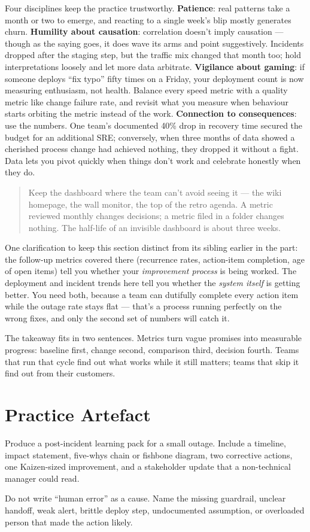 Four disciplines keep the practice trustworthy. \textbf{Patience}: real patterns take a month or two to emerge, and reacting to a single week's blip mostly generates churn. \textbf{Humility about causation}: correlation doesn't imply causation — though as the saying goes, it does wave its arms and point suggestively. Incidents dropped after the staging step, but the traffic mix changed that month too; hold interpretations loosely and let more data arbitrate. \textbf{Vigilance about gaming}: if someone deploys ``fix typo'' fifty times on a Friday, your deployment count is now measuring enthusiasm, not health. Balance every speed metric with a quality metric like change failure rate, and revisit what you measure when behaviour starts orbiting the metric instead of the work. \textbf{Connection to consequences}: use the numbers. One team's documented 40\% drop in recovery time secured the budget for an additional SRE; conversely, when three months of data showed a cherished process change had achieved nothing, they dropped it without a fight. Data lets you pivot quickly when things don't work and celebrate honestly when they do.



\begin{quote}\small
Keep the dashboard where the team can't avoid seeing it — the wiki homepage, the wall monitor, the top of the retro agenda. A metric reviewed monthly changes decisions; a metric filed in a folder changes nothing. The half-life of an invisible dashboard is about three weeks.
\end{quote}


One clarification to keep this section distinct from its sibling earlier in the part: the follow-up metrics covered there (recurrence rates, action-item completion, age of open items) tell you whether your \emph{improvement process} is being worked. The deployment and incident trends here tell you whether the \emph{system itself} is getting better. You need both, because a team can dutifully complete every action item while the outage rate stays flat — that's a process running perfectly on the wrong fixes, and only the second set of numbers will catch it.


The takeaway fits in two sentences. Metrics turn vague promises into measurable progress: baseline first, change second, comparison third, decision fourth. Teams that run that cycle find out what works while it still matters; teams that skip it find out from their customers.

\section{Practice Artefact}

Produce a post-incident learning pack for a small outage. Include a timeline, impact statement, five-whys chain or fishbone diagram, two corrective actions, one Kaizen-sized improvement, and a stakeholder update that a non-technical manager could read.


Do not write ``human error'' as a cause. Name the missing guardrail, unclear handoff, weak alert, brittle deploy step, undocumented assumption, or overloaded person that made the action likely.
